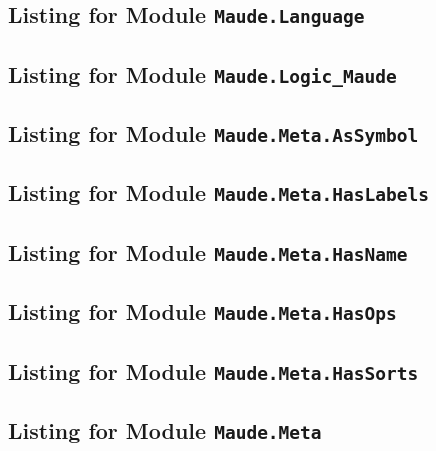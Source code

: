 \documentclass[11pt]{article}
\begin{document}
\subsection{Listing for Module \texttt{Maude.Language}}
\label{imp:Maude/Language.hs}

\clearpage
\subsection{Listing for Module \texttt{Maude.Logic\_Maude}}
\label{imp:Maude/Logic_Maude.hs}

\clearpage
% 
\subsection{Listing for Module \texttt{Maude.Meta.AsSymbol}}
\label{imp:Maude/Meta/AsSymbol.hs}

\clearpage
\subsection{Listing for Module \texttt{Maude.Meta.HasLabels}}
\label{imp:Maude/Meta/HasLabels.hs}

\clearpage
\subsection{Listing for Module \texttt{Maude.Meta.HasName}}
\label{imp:Maude/Meta/HasName.hs}

\clearpage
\subsection{Listing for Module \texttt{Maude.Meta.HasOps}}
\label{imp:Maude/Meta/HasOps.hs}

\clearpage
\subsection{Listing for Module \texttt{Maude.Meta.HasSorts}}
\label{imp:Maude/Meta/HasSorts.hs}

\clearpage
\subsection{Listing for Module \texttt{Maude.Meta}}
\label{imp:Maude/Meta.hs}

\clearpage
\end{document}
